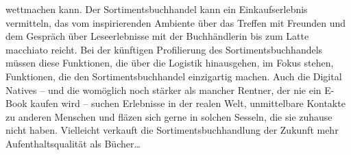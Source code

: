 \documentclass[a4paper,
fontsize=11pt,
oneside,
numbers=noperiodatend,
parskip=half-,
bibliography=totoc,
final
]{scrartcl}
\begin{document}
\begin{itemize}
  wettmachen kann. Der Sortimentsbuchhandel kann ein Einkaufserlebnis
  vermitteln, das vom inspirierenden Ambiente über das Treffen mit
  Freunden und dem Gespräch über Leseerlebnisse mit der Buchhändlerin
  bis zum Latte macchiato reicht. Bei der künftigen Profilierung des
  Sortimentsbuchhandels müssen diese Funktionen, die über die Logistik
  hinausgehen, im Fokus stehen, Funktionen, die den Sortimentsbuchhandel
  einzigartig machen. Auch die Digital Natives -- und die womöglich noch
  stärker als mancher Rentner, der nie ein E-Book kaufen wird -- suchen
  Erlebnisse in der realen Welt, unmittelbare Kontakte zu anderen
  Menschen und fläzen sich gerne in solchen Sesseln, die sie zuhause
  nicht haben. Vielleicht verkauft die Sortimentsbuchhandlung der
  Zukunft mehr Aufenthaltsqualität als Bücher\ldots{}
\end{itemize}

\end{document}

